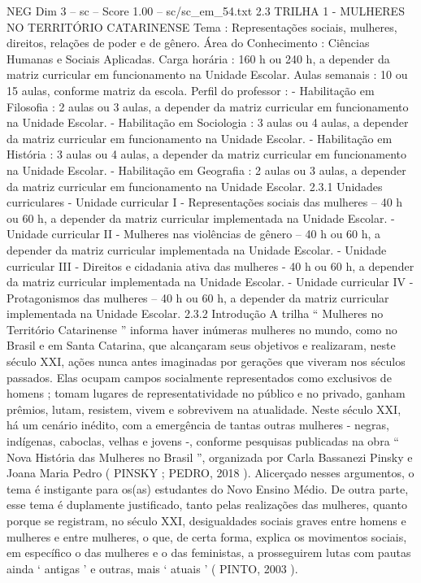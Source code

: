 \begin{textsample}{NEG Dim 3 – sc – Score 1.00 – sc/sc\_em\_54.txt}  \label{ex:f3_neg_222}
2.3 TRILHA 1 - MULHERES NO TERRITÓRIO CATARINENSE Tema : Representações sociais, mulheres, direitos, relações de poder e de gênero.
Área do Conhecimento : Ciências Humanas e Sociais Aplicadas.
Carga horária : 160 h ou 240 h, a depender da matriz curricular em funcionamento na Unidade Escolar.
Aulas semanais : 10 ou 15 aulas, conforme matriz da escola.
Perfil do professor : - Habilitação em Filosofia : 2 aulas ou 3 aulas, a depender da matriz curricular em funcionamento na Unidade Escolar. - Habilitação em Sociologia : 3 aulas ou 4 aulas, a depender da matriz curricular em funcionamento na Unidade Escolar. - Habilitação em História : 3 aulas ou 4 aulas, a depender da matriz curricular em funcionamento na Unidade Escolar. - Habilitação em Geografia : 2 aulas ou 3 aulas, a depender da matriz curricular em funcionamento na Unidade Escolar. 2.3.1 Unidades curriculares - Unidade curricular I - Representações sociais das mulheres – 40 h ou 60 h, a depender da matriz curricular implementada na Unidade Escolar. - Unidade curricular II - Mulheres nas violências de gênero – 40 h ou 60 h, a depender da matriz curricular implementada na Unidade Escolar. - Unidade curricular III - Direitos e cidadania ativa das mulheres - 40 h ou 60 h, a depender da matriz curricular implementada na Unidade Escolar. - Unidade curricular IV - Protagonismos das mulheres – 40 h ou 60 h, a depender da matriz curricular implementada na Unidade Escolar. 2.3.2 Introdução A trilha “ Mulheres no Território Catarinense ” informa haver inúmeras mulheres no mundo, como no Brasil e em Santa Catarina, que alcançaram seus objetivos e realizaram, neste século XXI, ações nunca antes imaginadas por gerações que viveram nos séculos passados.
Elas ocupam campos socialmente representados como exclusivos de homens ; tomam lugares de representatividade no público e no privado, ganham prêmios, lutam, resistem, vivem e sobrevivem na atualidade.
Neste século XXI, há um cenário inédito, com a emergência de tantas outras mulheres - negras, indígenas, caboclas, velhas e jovens -, conforme pesquisas publicadas na obra “ Nova História das Mulheres no Brasil ”, organizada por Carla Bassanezi Pinsky e Joana Maria Pedro ( PINSKY ; PEDRO, 2018 ).
Alicerçado nesses argumentos, o tema é instigante para os(as) estudantes do Novo Ensino Médio.
De outra parte, esse tema é duplamente justificado, tanto pelas realizações das mulheres, quanto porque se registram, no século XXI, desigualdades sociais graves entre homens e mulheres e entre mulheres, o que, de certa forma, explica os movimentos sociais, em específico o das mulheres e o das feministas, a prosseguirem lutas com pautas ainda ‘ antigas ’ e outras, mais ‘ atuais ’ ( PINTO, 2003 ).

\end{textsample}
